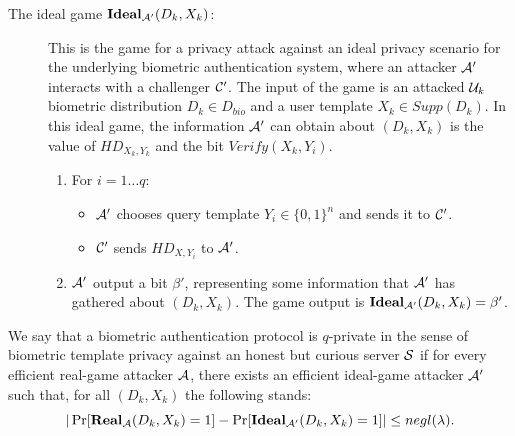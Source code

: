 \begin{description}
\item[The ideal game $\mathbf{Ideal}_{\mathcal{A}'}(D_k,X_k)$:] This is the game for a privacy attack against an ideal
  privacy scenario for the underlying biometric authentication system, where an attacker $\mathcal{A}'$ interacts with a
  challenger $\mathcal{C}'$. The input of the game is an attacked $\mathcal{U}_k$ biometric distribution $D_k \in D_{bio}$ and a
  user template $X_k \in Supp(D_k)$. In this ideal game, the information $\mathcal{A}'$ can obtain about $(D_k,X_k)$ is the
  value of \(HD_{X_{k}, Y_{k}}\) and the bit $Verify(X_k,Y_i)$.
  \begin{enumerate}
  \item For $i = 1 \dots q$:
    \begin{itemize}
    \item $\mathcal{A}'$ chooses query template $Y_i \in \{0,1\}^n$ and sends it to $\mathcal{C}'$.
    \item $\mathcal{C}'$ sends $HD_{X,Y_{i}}$ to $\mathcal{A}'$.
    \end{itemize}
  \item $\mathcal{A}'$ output a bit $\beta'$, representing some information that $\mathcal{A}'$ has gathered about
    $(D_k,X_k)$. The game output is $\mathbf{Ideal}_{\mathcal{A}'}(D_k,X_k) = \beta'$.
  \end{enumerate}
\end{description}
\begin{definition}
   We say that a biometric authentication protocol is $q$-private in the sense of
  biometric template privacy against an honest but curious server $\mathcal{S}$ if for every efficient real-game attacker
  $\mathcal{A}$, there exists an efficient ideal-game attacker $\mathcal{A}'$ such that, for all $(D_k,X_k)$ the following stands:
  \[
    |\Pr[\mathbf{Real}_{\mathcal{A}}(D_k,X_k) = 1] - \Pr[\mathbf{Ideal}_{\mathcal{A}'}(D_k,X_k) = 1]| \leq negl(\lambda).
  \]
\end{definition}

